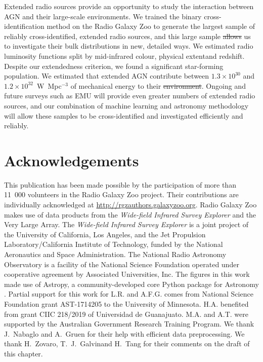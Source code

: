 \documentclass[11pt, a4paper]{book}
\providecommand{\DIFaddtex}[1]{{\protect\color{blue}\uwave{#1}}} %
\providecommand{\DIFdeltex}[1]{{\protect\color{red}\sout{#1}}}                      %
\providecommand{\DIFaddbegin}{} %
\providecommand{\DIFaddend}{} %
\providecommand{\DIFdelbegin}{} %
\providecommand{\DIFdelend}{} %
\providecommand{\DIFadd}[1]{\texorpdfstring{\DIFaddtex{#1}}{#1}} %
\providecommand{\DIFdel}[1]{\texorpdfstring{\DIFdeltex{#1}}{}} %
\newcommand{\DIFscaledelfig}{0.5}
\newlength{\DIFdelgraphicswidth} %
\newlength{\DIFdelgraphicsheight} %
\newcommand{\DIFaddincludegraphics}[2][]{{\color{blue}\fbox{\DIFOincludegraphics[#1]{#2}}}} %
\newcommand{\DIFdelincludegraphics}[2][]{%
\sbox{\DIFdelgraphicsbox}{\DIFOincludegraphics[#1]{#2}}%
\settoboxwidth{\DIFdelgraphicswidth}{\DIFdelgraphicsbox} %
\settoboxtotalheight{\DIFdelgraphicsheight}{\DIFdelgraphicsbox} %
\scalebox{\DIFscaledelfig}{%
\parbox[b]{\DIFdelgraphicswidth}{\usebox{\DIFdelgraphicsbox}\\[-\baselineskip] \rule{\DIFdelgraphicswidth}{0em}}\llap{\resizebox{\DIFdelgraphicswidth}{\DIFdelgraphicsheight}{%
\setlength{\unitlength}{\DIFdelgraphicswidth}%
\begin{picture}(1,1)%
\thicklines\linethickness{2pt} %
{\color[rgb]{1,0,0}\put(0,0){\framebox(1,1){}}}%
{\color[rgb]{1,0,0}\put(0,0){\line( 1,1){1}}}%
{\color[rgb]{1,0,0}\put(0,1){\line(1,-1){1}}}%
\end{picture}%
}\hspace*{3pt}}} %
} %
\DeclareRobustCommand{\DIFaddbegin}{\DIFOaddbegin \let\includegraphics\DIFaddincludegraphics} %
\DeclareRobustCommand{\DIFaddend}{\DIFOaddend \let\includegraphics\DIFOincludegraphics} %
\DeclareRobustCommand{\DIFdelbegin}{\DIFOdelbegin \let\includegraphics\DIFdelincludegraphics} %
\DeclareRobustCommand{\DIFdelend}{\DIFOaddend \let\includegraphics\DIFOincludegraphics} %
\begin{document}
  Extended radio sources provide an opportunity to study the interaction between AGN and their large-scale environments. We trained the binary cross-identification method on the Radio Galaxy Zoo to generate the largest sample of reliably cross-identified, extended radio sources, and this large sample \DIFdelbegin \DIFdel{allows }\DIFdelend \DIFaddbegin \DIFadd{allowed }\DIFaddend us to investigate their bulk distributions in new, detailed ways. We estimated radio luminosity functions split by mid-infrared colour, physical extent\DIFaddbegin \DIFadd{, }\DIFaddend and redshift. Despite our extendedness criterion, we found a significant star-forming population. We estimated that extended AGN contribute between $1.3 \times 10^{30}$ and $1.2 \times 10^{32}$~W~Mpc$^{-3}$ of mechanical energy to their \DIFdelbegin \DIFdel{environment}\DIFdelend \DIFaddbegin \DIFadd{environments}\DIFaddend . Ongoing and future surveys such as EMU will provide even greater numbers of extended radio sources, and our combination of machine learning and astronomy methodology will allow these samples to be cross-identified and investigated efficiently and reliably.

\section{Acknowledgements}

This publication has been made possible by the participation of more than
11~000 volunteers in the Radio Galaxy Zoo project. Their contributions are
individually acknowledged at \url{http://rgzauthors.galaxyzoo.org}. Radio
Galaxy Zoo makes use of data products from the \emph{Wide-field Infrared Survey
Explorer} and the Very Large Array. The \emph{Wide-field Infrared Survey Explorer}
is a joint project of the University of California, Los Angeles, and the Jet
Propulsion Laboratory/California Institute of Technology, funded by the
National Aeronautics and Space Administration. The National Radio Astronomy
Observatory is a facility of the National Science Foundation operated under
cooperative agreement by Associated Universities, Inc. The figures in this
work made use of Astropy, a community-developed core Python package for
Astronomy \citep{astropy}. Partial support for this work for L.R. and A.F.G. comes from National Science Foundation grant AST-1714205 to the University of Minnesota. H.A. benefited from grant CIIC 218/2019 of Universidad de Guanajuato. M.A. and A.T. were supported by the Australian Government Research Training Program. We thank J.~Nabaglo and A.~Gruen for their help with efficient data preprocessing. We thank H.~Zovaro, T.~J.~Galvin\DIFaddbegin \DIFadd{, }\DIFaddend and H.~Tang for their comments on the draft of this chapter.
\end{document}

